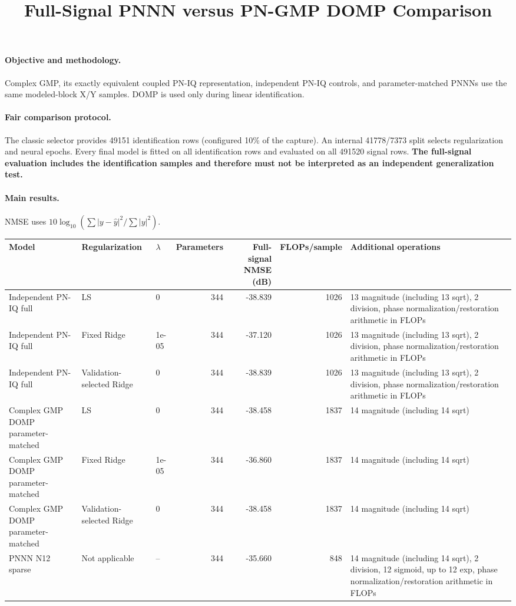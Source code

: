 \documentclass[10pt]{article}
\title{Full-Signal PNNN versus PN-GMP DOMP Comparison}
\author{}\date{}
\begin{document}
\maketitle
\paragraph{Objective and methodology.} Complex GMP, its exactly equivalent coupled PN-IQ representation, independent PN-IQ controls, and parameter-matched PNNNs use the same modeled-block X/Y samples. DOMP is used only during linear identification.
\paragraph{Fair comparison protocol.} The classic selector provides 49151 identification rows (configured 10\% of the capture). An internal 41778/7373 split selects regularization and neural epochs. Every final model is fitted on all identification rows and evaluated on all 491520 signal rows. \textbf{The full-signal evaluation includes the identification samples and therefore must not be interpreted as an independent generalization test.}
\paragraph{Main results.} NMSE uses $10\log_{10}(\sum|y-\hat y|^2/\sum|y|^2)$.
\begin{center}\scriptsize\begin{tabularx}{\linewidth}{XllrrrX}
\toprule
Model & Regularization & $\lambda$ & Parameters & Full-signal NMSE (dB) & FLOPs/sample & Additional operations \\ \midrule
Independent PN-IQ full & LS & 0 & 344 & -38.839 & 1026 & 13 magnitude (including 13 sqrt), 2 division, phase normalization/restoration arithmetic in FLOPs \\ 
Independent PN-IQ full & Fixed Ridge & 1e-05 & 344 & -37.120 & 1026 & 13 magnitude (including 13 sqrt), 2 division, phase normalization/restoration arithmetic in FLOPs \\ 
Independent PN-IQ full & Validation-selected Ridge & 0 & 344 & -38.839 & 1026 & 13 magnitude (including 13 sqrt), 2 division, phase normalization/restoration arithmetic in FLOPs \\ 
Complex GMP DOMP parameter-matched & LS & 0 & 344 & -38.458 & 1837 & 14 magnitude (including 14 sqrt) \\ 
Complex GMP DOMP parameter-matched & Fixed Ridge & 1e-05 & 344 & -36.860 & 1837 & 14 magnitude (including 14 sqrt) \\ 
Complex GMP DOMP parameter-matched & Validation-selected Ridge & 0 & 344 & -38.458 & 1837 & 14 magnitude (including 14 sqrt) \\ 
PNNN N12 sparse & Not applicable & -- & 344 & -35.660 & 848 & 14 magnitude (including 14 sqrt), 2 division, 12 sigmoid, up to 12 exp, phase normalization/restoration arithmetic in FLOPs \\ 
\bottomrule\end{tabularx}\end{center}
\end{document}

